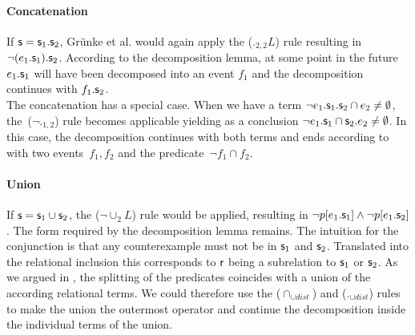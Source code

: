 \documentclass[a4paper,twoside,12pt, english]{article}
\begin{document}
\paragraph{Concatenation} If $\textsf{\upshape s} = \textsf{\upshape s}_1.\textsf{\upshape s}_2$, Grünke et al. would again apply the ($._{2,2}L$) rule resulting in~$\neg (e_1.\textsf{\upshape s}_1).\textsf{\upshape s}_2$. According to the decomposition lemma, at some point in the future $e_1.\textsf{\upshape s}_1$ will have been decomposed into an event $f_1$ and the decomposition continues with $f_1.\textsf{\upshape s}_2$. \\

The concatenation has a special case. When we have a term $\neg e_1.\textsf{\upshape s}_1.\textsf{\upshape s}_2 \cap e_2 \neq \emptyset$, the~($\neg ._{1,2}$) rule becomes applicable yielding as a conclusion $\neg e_1.\textsf{\upshape s}_1 \cap \textsf{\upshape s}_2.e_2 \neq \emptyset$. In this case, the decomposition continues with both terms and ends according to  with two events~$f_1,f_2$ and the predicate~$\neg f_1 \cap f_2$.

\newpage
\paragraph{Union} If $\textsf{\upshape s} = \textsf{\upshape s}_1 \cup \textsf{\upshape s}_2$, the ($\neg {\cup_2} L$) rule would be applied, resulting in $\neg p[e_1.\textsf{\upshape s}_1] \land \neg p[e_1.\textsf{\upshape s}_2]$. The form required by the decomposition lemma remains. The intuition for the conjunction is that any counterexample must not be in $\textsf{\upshape s}_1$ and $\textsf{\upshape s}_2$. Translated into the relational inclusion this corresponds to $\textsf{\upshape r}$ being a subrelation to $\textsf{\upshape s}_1$ or $\textsf{\upshape s}_2$. As we argued in , the splitting of the predicates coincides with a union of the according relational terms. We could therefore use the ($\cap_{\cup dist}$) and ($._{\cup dist}$) rules to make the union the outermost operator and continue the decomposition inside the individual terms of the union.
\end{document}
